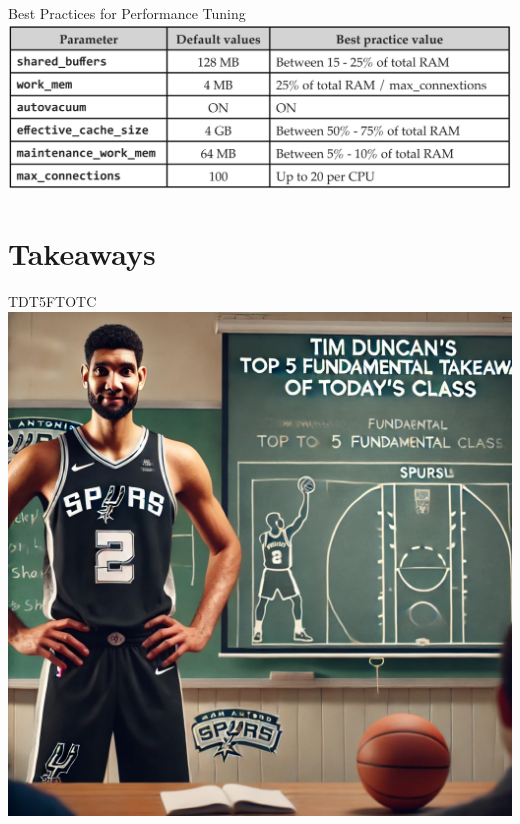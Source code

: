 \documentclass[aspectratio=169]{beamer}
\begin{document}
\begin{frame}{Best Practices for Performance Tuning}
    \centering
    \includegraphics[width=\textwidth]{figures/best}
\end{frame}

\section*{Takeaways}

\begin{frame}{TDT5FTOTC}
    \centering
    \includegraphics[height=0.9\textheight]{figures/tim.png}
\end{frame}
\end{document}
